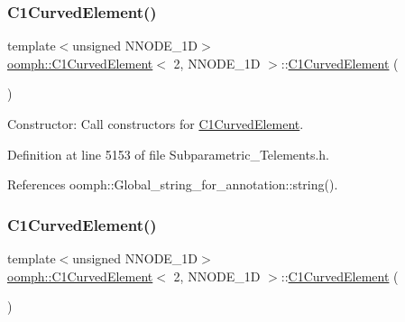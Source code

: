 \subsubsection{\texorpdfstring{C1\+Curved\+Element()}{C1CurvedElement()}\hspace{0.1cm}{\footnotesize\ttfamily [1/2]}}
{\footnotesize\ttfamily template$<$unsigned N\+N\+O\+D\+E\+\_\+1D$>$ \\
\hyperlink{classoomph_1_1C1CurvedElement}{oomph\+::\+C1\+Curved\+Element}$<$ 2, N\+N\+O\+D\+E\+\_\+1D $>$\+::\hyperlink{classoomph_1_1C1CurvedElement}{C1\+Curved\+Element} (\begin{DoxyParamCaption}{ }\end{DoxyParamCaption})\hspace{0.3cm}{\ttfamily [inline]}}



Constructor\+: Call constructors for \hyperlink{classoomph_1_1C1CurvedElement}{C1\+Curved\+Element}. 



Definition at line 5153 of file Subparametric\+\_\+\+Telements.\+h.



References oomph\+::\+Global\+\_\+string\+\_\+for\+\_\+annotation\+::string().

\mbox{\label{classoomph_1_1C1CurvedElement_3_012_00_01NNODE__1D_01_4_a0d00b19541ec32162c0d096fef8fcf74}} 
\subsubsection{\texorpdfstring{C1\+Curved\+Element()}{C1CurvedElement()}\hspace{0.1cm}{\footnotesize\ttfamily [2/2]}}
{\footnotesize\ttfamily template$<$unsigned N\+N\+O\+D\+E\+\_\+1D$>$ \\
\hyperlink{classoomph_1_1C1CurvedElement}{oomph\+::\+C1\+Curved\+Element}$<$ 2, N\+N\+O\+D\+E\+\_\+1D $>$\+::\hyperlink{classoomph_1_1C1CurvedElement}{C1\+Curved\+Element} (\begin{DoxyParamCaption}\item[{const \hyperlink{classoomph_1_1C1CurvedElement}{C1\+Curved\+Element}$<$ 2, N\+N\+O\+D\+E\+\_\+1D $>$ \&}]{ }\end{DoxyParamCaption})\hspace{0.3cm}{\ttfamily [inline]}}



